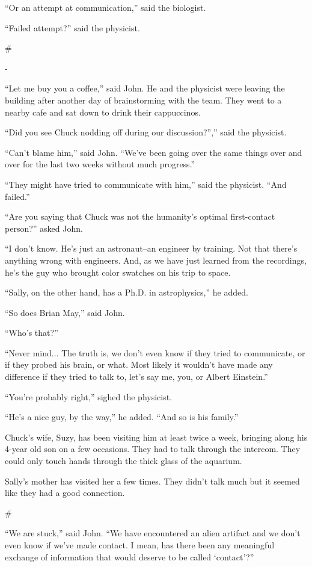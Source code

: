 \documentclass[12pt]{book}
\newcommand{\sbreak}{
\begin{center}
  \#
\end{center}
}
\begin{document}
``Or an attempt at communication,'' said the biologist. 

``Failed attempt?'' said the physicist.

\sbreak-

``Let me buy you a coffee,'' said John. He and the physicist were leaving the building after another day of brainstorming with the team. They went to a nearby cafe and sat down to drink their cappuccinos.

``Did you see Chuck nodding off during our discussion?'','' said the physicist.

``Can't blame him,'' said John. ``We've been going over the same things over and over for the last two weeks without much progress.''

``They might have tried to communicate with him,'' said the physicist. ``And failed.''

``Are you saying that Chuck was not the humanity's optimal first-contact person?'' asked John.

``I don't know. He's just an astronaut--an engineer by training. Not that there's anything wrong with engineers. And, as we have just learned from the recordings, he's the guy who brought color swatches on his trip to space.

``Sally, on the other hand, has a Ph.D. in astrophysics,'' he added.

``So does Brian May,'' said John.

``Who's that?''

``Never mind... The truth is, we don't even know if they tried to communicate, or if they probed his brain, or what. Most likely it wouldn't have made any difference if they tried to talk to, let's say me, you, or Albert Einstein.''

``You're probably right,'' sighed the physicist.

``He's a nice guy, by the way,'' he added. ``And so is his family.'' 

Chuck's wife, Suzy, has been visiting him at least twice a week, bringing along his 4-year old son on a few occasions. They had to talk through the intercom. They could only touch hands through the thick glass of the aquarium. 

Sally's mother has visited her a few times. They didn't talk much but it seemed like they had a good connection. 

\sbreak

``We are stuck,'' said John. ``We have encountered an alien artifact and we don't even know if we've made contact. I mean, has there been any meaningful exchange of information that would deserve to be called `contact'?''
\end{document}
